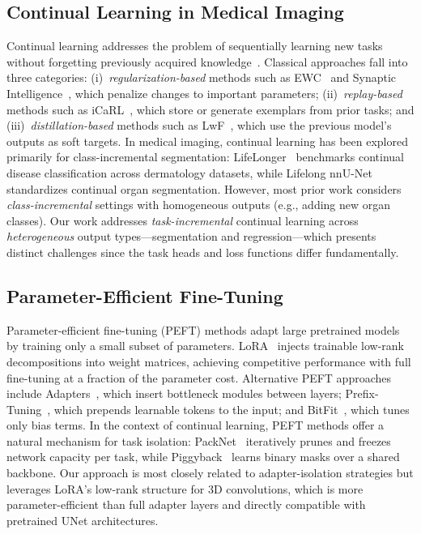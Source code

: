 \documentclass[journal,twoside,web]{ieeecolor}
\begin{document}
\subsection{Continual Learning in Medical Imaging}

Continual learning addresses the problem of sequentially learning new tasks without forgetting previously acquired knowledge~\cite{mccloskey1989catastrophic}. Classical approaches fall into three categories: (i)~\emph{regularization-based} methods such as EWC~\cite{kirkpatrick2017} and Synaptic Intelligence~\cite{zenke2017continual}, which penalize changes to important parameters; (ii)~\emph{replay-based} methods such as iCaRL~\cite{rebuffi2017icarl}, which store or generate exemplars from prior tasks; and (iii)~\emph{distillation-based} methods such as LwF~\cite{li2017lwf}, which use the previous model's outputs as soft targets. In medical imaging, continual learning has been explored primarily for class-incremental segmentation: LifeLonger~\cite{derakhshani2022lifelonger} benchmarks continual disease classification across dermatology datasets, while Lifelong nnU-Net~\cite{gonzalez2023lifelong} standardizes continual organ segmentation. However, most prior work considers \emph{class-incremental} settings with homogeneous outputs (e.g., adding new organ classes). Our work addresses \emph{task-incremental} continual learning across \emph{heterogeneous} output types---segmentation and regression---which presents distinct challenges since the task heads and loss functions differ fundamentally.

\subsection{Parameter-Efficient Fine-Tuning}

Parameter-efficient fine-tuning (PEFT) methods adapt large pretrained models by training only a small subset of parameters. LoRA~\cite{hu2022lora} injects trainable low-rank decompositions into weight matrices, achieving competitive performance with full fine-tuning at a fraction of the parameter cost. Alternative PEFT approaches include Adapters~\cite{houlsby2019}, which insert bottleneck modules between layers; Prefix-Tuning~\cite{prefix_tuning}, which prepends learnable tokens to the input; and BitFit~\cite{bitfit}, which tunes only bias terms. In the context of continual learning, PEFT methods offer a natural mechanism for task isolation: PackNet~\cite{packnet} iteratively prunes and freezes network capacity per task, while Piggyback~\cite{piggyback} learns binary masks over a shared backbone. Our approach is most closely related to adapter-isolation strategies but leverages LoRA's low-rank structure for 3D convolutions, which is more parameter-efficient than full adapter layers and directly compatible with pretrained UNet architectures.
\end{document}
